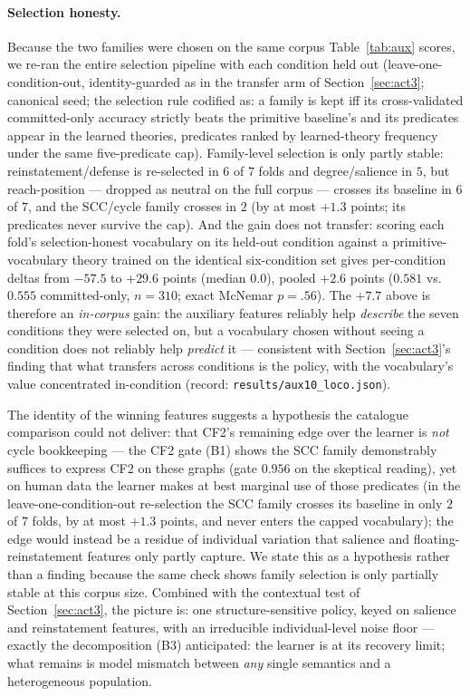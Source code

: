 \documentclass[review,12pt]{elsarticle}
\theoremstyle{definition}
\theoremstyle{remark}
\begin{document}
\paragraph{Selection honesty.} Because the two families were chosen on the
same corpus Table~\ref{tab:aux} scores, we re-ran the entire selection
pipeline with each condition held out (leave-one-condition-out,
identity-guarded as in the transfer arm of Section~\ref{sec:act3}; canonical
seed; the selection rule codified as: a family is kept iff its
cross-validated committed-only accuracy strictly beats the primitive
baseline's and its predicates appear in the learned theories, predicates
ranked by learned-theory frequency under the same five-predicate cap).
Family-level selection is only partly stable: reinstatement/defense is
re-selected in $6$ of $7$ folds and degree/salience in $5$, but
reach-position --- dropped as neutral on the full corpus --- crosses its
baseline in $6$ of $7$, and the SCC/cycle family crosses in $2$ (by at most
$+1.3$ points; its predicates never survive the cap). And the gain does not
transfer: scoring each fold's selection-honest vocabulary on its held-out
condition against a primitive-vocabulary theory trained on the identical
six-condition set gives per-condition deltas from $-57.5$ to $+29.6$ points
(median $0.0$), pooled $+2.6$ points ($0.581$ vs.\ $0.555$ committed-only,
$n{=}310$; exact McNemar $p{=}.56$). The $+7.7$ above is therefore an
\emph{in-corpus} gain: the auxiliary features reliably help \emph{describe}
the seven conditions they were selected on, but a vocabulary chosen without
seeing a condition does not reliably help \emph{predict} it --- consistent
with Section~\ref{sec:act3}'s finding that what transfers across conditions
is the policy, with the vocabulary's value concentrated in-condition
(record: \texttt{results/aux10\_loco.json}).


The identity of the winning features suggests a hypothesis the catalogue
comparison could not deliver: that CF2's remaining edge over the learner is
\emph{not} cycle bookkeeping --- the CF2 gate (B1) shows the SCC family
demonstrably suffices to express CF2 on these graphs (gate $0.956$ on the
skeptical reading), yet on human data the learner makes at best marginal use
of those predicates (in the leave-one-condition-out re-selection the SCC
family crosses its baseline in only $2$ of $7$ folds, by at most $+1.3$
points, and never enters the capped vocabulary); the edge would instead be a
residue of individual variation that salience and floating-reinstatement
features only partly capture. We state this as a hypothesis rather than a
finding because the same check shows family selection is only partially
stable at this corpus size. Combined with the contextual test of Section~\ref{sec:act3},
the picture is: one structure-sensitive policy, keyed on salience and
reinstatement features, with an irreducible individual-level noise floor ---
exactly the decomposition (B3) anticipated: the learner is at its recovery
limit; what remains is model mismatch between \emph{any} single semantics and a
heterogeneous population.
\end{document}
